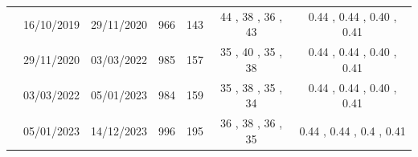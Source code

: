 \documentclass[authoryear,review,11pt]{elsarticle}
\begin{document}
\begin{scriptsize}
\begin{longtable}{ccccccc}
		& 16/10/2019                      & 29/11/2020                    & 966                        & 143                       & 44                          , 38                          , 36                          , 43                          & 0.44                        , 0.44                        , 0.40                        , 0.41                        \\
		& 29/11/2020                      & 03/03/2022                    & 985                        & 157                       & 35                          , 40                          , 35                          , 38                          & 0.44                        , 0.44                        , 0.40                        , 0.41                        \\
		& 03/03/2022                      & 05/01/2023                    & 984                        & 159                       & 35                          , 38                          , 35                          , 34                          & 0.44                        , 0.44                        , 0.40                        , 0.41                        \\
		& 05/01/2023 & 14/12/2023 & 996 & 195 & 36 , 38 , 36 , 35 & 0.44 , 0.44 , 0.4 , 0.41 \\


\end{longtable}
\end{scriptsize}
\end{document}
